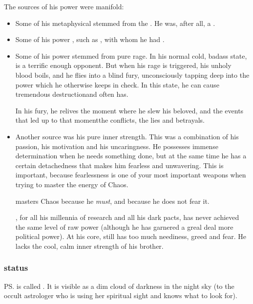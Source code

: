 The sources of his power were manifold:

\begin{itemize}
  \item 
    Some of his metaphysical stemmed from the \xss. 
    He was, after all, a \shaeeroth.
  \item 
    Some of his power , such as , with whom he had . 
  \item 
    Some of his power stemmed from pure rage.
    In his normal cold, badass state, \Ishna{} is a terrific enough opponent. 
    But when his rage is triggered, his unholy \xzaishannic{} blood boils, and he flies into a blind fury, unconsciously tapping deep into the \chaotic{} power which he otherwise keeps in check. 
    In this state, he can cause tremendous destruction\dash and often has.
    
    In his fury, he relives the moment where he slew his beloved, and the events that led up to that moment\dash the conflicts, the lies and betrayals.
  \item 
    Another source was his pure inner strength. 
    This was a combination of his passion, his motivation and his uncaringness. 
    He possesses immense determination when he needs something done, but at the same time he has a certain detachedness that makes him fearless and unwavering. This is important, because fearlessness is one of your most important weapons when trying to master the energy of Chaos. 
    
    \Ishna{} masters Chaos because he \emph{must}, and because he does not fear it.
    
    , for all his millennia of research and all his dark pacts, has never achieved the same level of raw power (although he has garnered a greal deal more political power). At his core, \Secherdamon{} still has too much neediness, greed and fear. He lacks the cool, calm inner strength of his brother. 
\end{itemize}









\subsubsection{\Vertex{} status}
\ps{\Ishnaruchaefir} \vertex{} is called . 
It is visible as a dim cloud of darkness in the night sky (to the occult astrologer who is using her spiritual sight and knows what to look for). 

